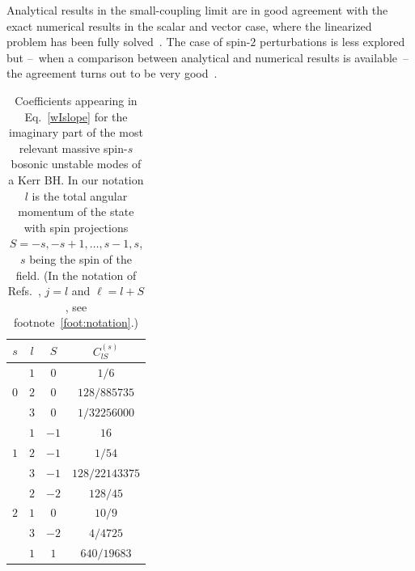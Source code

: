 \documentclass[11pt]{article}
\numberwithin{equation}{section} %
\begin{document}
Analytical results in the small-coupling limit are in good agreement with the exact numerical results in the scalar and vector case, where the linearized problem has been fully 
solved~\cite{Detweiler:1980uk,Dolan:2007mj,Baryakhtar:2017ngi,Baumann:2019eav,Dolan:2018dqv}. The case of spin-$2$ 
perturbations is 
less explored but --~when a comparison between analytical and numerical results is available~-- the agreement turns out 
to be very good~\cite{Brito:2013wya,Brito:2020lup}.


\begin{table}\label{tab:inst}
\begin{center}
 \caption{Coefficients appearing in Eq.~\eqref{wIslope} for the imaginary part of the most relevant massive spin-$s$ 
bosonic unstable modes of a Kerr BH. In our notation $l$ is the total angular momentum of the state with spin 
projections $S=-s,-s+1,\ldots,s-1,s$, $s$ being the spin of the field. (In the notation of 
Refs.~\cite{Endlich:2016jgc,Baryakhtar:2017ngi}, $j=l$ and $\ell=l+S$, see footnote~\ref{foot:notation}.)}
\vspace{0.2cm}
 \begin{tabular}{c|cc|c}
  \hline
  \hline
  $s$ 	& $l$ 	& 	 $S$ 	& 	$C^{(s)}_{lS}$	\\
  \hline
  \multirow{3}{*}{$0$} 	& $1$	&	 $0$	&	$1/6$	\\
   	& $2$	&	 $0$	&	$128/885735$		\\
   	& $3$	&	 $0$	&	$1/32256000$	\\
  \hline
  \multirow{3}{*}{$1$} 	& $1$	&	 $-1$	&	$16$	\\
   	& $2$	&	 $-1$	&	$1/54$		\\
   	& $3$	&	 $-1$	&	$128/22143375$	\\
  \hline
  \multirow{3}{*}{$2$} 	& $2$	&	 $-2$	&	$128/45$	\\
   	& $1$	&	 $0$	&	$10/9$		\\
   	& $3$	&	 $-2$	&	$4/4725$	\\
   	& $1$	&	 $1$	&	$640/19683$	\\
  \hline
  \hline
 \end{tabular}
\end{center}
\end{table}

\end{document}
